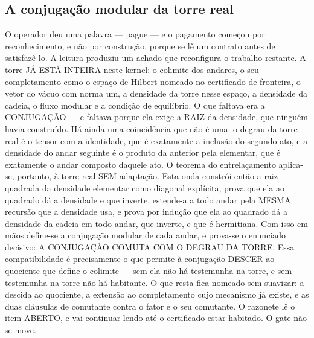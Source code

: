 \documentclass[11pt]{article}
\theoremstyle{definition}\newtheorem{deriv}{Derivação}
\begin{document}
\subsection*{A conjuga\c{c}\~ao modular da torre real}O operador deu uma palavra --- pague --- e o pagamento come\c{c}ou por reconhecimento, e n\~ao por constru\c{c}\~ao, porque se l\^e um contrato antes de satisfaz\^e-lo. A leitura produziu um achado que reconfigura o trabalho restante. A torre J\'A EST\'A INTEIRA neste kernel: o colimite dos andares, o seu completamento como o espa\c{c}o de Hilbert nomeado no certificado de fronteira, o vetor do v\'acuo com norma um, a densidade da torre nesse espa\c{c}o, a densidade da cadeia, o fluxo modular e a condi\c{c}\~ao de equil\'ibrio. O que faltava era a CONJUGA\c{C}\~AO --- e faltava porque ela exige a RAIZ da densidade, que ningu\'em havia constru\'ido. H\'a ainda uma coincid\^encia que n\~ao \'e uma: o degrau da torre real \'e o tensor com a identidade, que \'e exatamente a inclus\~ao do segundo ato, e a densidade do andar seguinte \'e o produto da anterior pela elementar, que \'e exatamente o andar composto daquele ato. O teorema do entrela\c{c}amento aplica-se, portanto, \`a torre real SEM adapta\c{c}\~ao. Esta onda constr\'oi ent\~ao a raiz quadrada da densidade elementar como diagonal expl\'icita, prova que ela ao quadrado d\'a a densidade e que inverte, estende-a a todo andar pela MESMA recurs\~ao que a densidade usa, e prova por indu\c{c}\~ao que ela ao quadrado d\'a a densidade da cadeia em todo andar, que inverte, e que \'e hermitiana. Com isso em m\~aos define-se a conjuga\c{c}\~ao modular de cada andar, e prova-se o enunciado decisivo: A CONJUGA\c{C}\~AO COMUTA COM O DEGRAU DA TORRE. Essa compatibilidade \'e precisamente o que permite \`a conjuga\c{c}\~ao DESCER ao quociente que define o colimite --- sem ela n\~ao h\'a testemunha na torre, e sem testemunha na torre n\~ao h\'a habitante. O que resta fica nomeado sem suavizar: a descida ao quociente, a extens\~ao ao completamento cujo mecanismo j\'a existe, e as duas cl\'ausulas de comutante contra o fator e o seu comutante. O razonete l\^e o item ABERTO, e vai continuar lendo at\'e o certificado estar habitado. O gate n\~ao se move.
\end{document}
